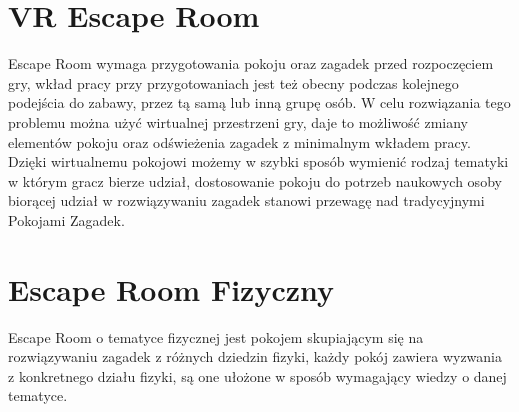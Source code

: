 \section{VR Escape Room}
Escape Room wymaga przygotowania pokoju oraz zagadek przed rozpoczęciem gry, wkład pracy przy przygotowaniach jest też obecny podczas kolejnego podejścia do zabawy, przez tą samą lub inną grupę osób. W celu rozwiązania tego problemu można użyć wirtualnej przestrzeni gry, daje to możliwość zmiany elementów pokoju oraz odświeżenia zagadek z minimalnym wkładem pracy.
Dzięki wirtualnemu pokojowi możemy w szybki sposób wymienić rodzaj tematyki w którym gracz bierze udział, dostosowanie pokoju do potrzeb naukowych osoby biorącej udział w rozwiązywaniu zagadek stanowi przewagę nad tradycyjnymi Pokojami Zagadek.

\section{Escape Room Fizyczny}
Escape Room o tematyce fizycznej jest pokojem skupiającym się na rozwiązywaniu zagadek z różnych dziedzin fizyki, każdy pokój zawiera wyzwania z konkretnego działu fizyki, są one ułożone w sposób wymagający wiedzy o danej tematyce. 

